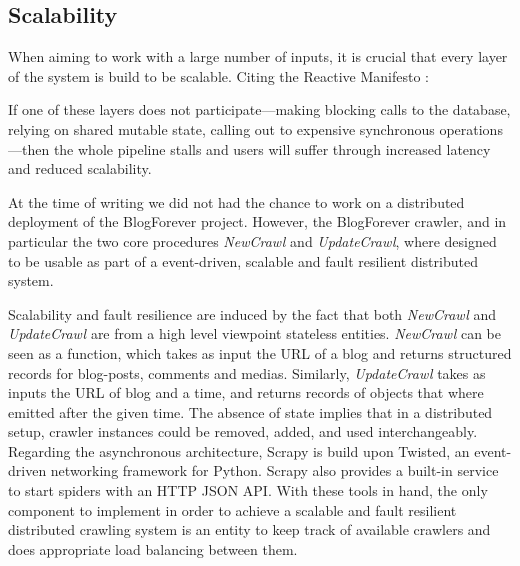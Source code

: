 \subsection{Scalability}
When aiming to work with a large number of inputs, it is crucial that every layer of the system is build to be scalable. Citing the Reactive Manifesto \cite{thereactivemanifesto2013}:

\begin{quoting}
  If one of these layers does not participate—making blocking calls to the database, relying on shared mutable state, calling out to expensive synchronous operations—then the whole pipeline stalls and users will suffer through increased latency and reduced scalability.
\end{quoting}

At the time of writing we did not had the chance to work on a distributed deployment of the BlogForever project. However, the BlogForever crawler, and in particular the two core procedures \emph{NewCrawl} and \emph{UpdateCrawl}, where designed to be usable as part of a event-driven, scalable and fault resilient distributed system.


Scalability and fault resilience are induced by the fact that both \emph{NewCrawl} and \emph{UpdateCrawl} are from a high level viewpoint stateless entities. \emph{NewCrawl} can be seen as a function, which takes as input the URL of a blog and returns structured records for blog-posts, comments and medias. Similarly, \emph{UpdateCrawl} takes as inputs the URL of blog and a time, and returns records of objects that where emitted after the given time. The absence of state implies that in a distributed setup, crawler instances could be removed, added, and used interchangeably. Regarding the asynchronous architecture, Scrapy is build upon Twisted\cite{twisted2013}, an event-driven networking framework for Python. Scrapy also provides a built-in service to start spiders with an HTTP JSON API. With these tools in hand, the only component to implement in order to achieve a scalable and fault resilient distributed crawling system is an entity to keep track of available crawlers and does appropriate load balancing between them.
